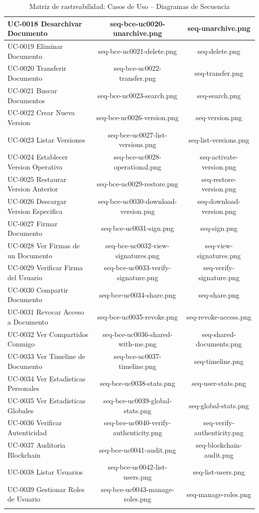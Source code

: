 \documentclass[11pt, a4paper]{article}
\begin{document}
{\begin{center}
\begin{longtable}{|p{2.8cm}|c|c|}
\hline
UC-0018 Desarchivar Documento & seq-bce-uc0020-unarchive.png & seq-unarchive.png \\
\hline
UC-0019 Eliminar Documento & seq-bce-uc0021-delete.png & seq-delete.png \\
\hline
UC-0020 Transferir Documento & seq-bce-uc0022-transfer.png & seq-transfer.png \\
\hline
UC-0021 Buscar Documentos & seq-bce-uc0023-search.png & seq-search.png \\
\hline
UC-0022 Crear Nueva Version & seq-bce-uc0026-version.png & seq-version.png \\
\hline
UC-0023 Listar Versiones & seq-bce-uc0027-list-versions.png & seq-list-versions.png \\
\hline
UC-0024 Establecer Version Operativa & seq-bce-uc0028-operational.png & seq-activate-version.png \\
\hline
UC-0025 Restaurar Version Anterior & seq-bce-uc0029-restore.png & seq-restore-version.png \\
\hline
UC-0026 Descargar Version Especifica & seq-bce-uc0030-download-version.png & seq-download-version.png \\
\hline
UC-0027 Firmar Documento & seq-bce-uc0031-sign.png & seq-sign.png \\
\hline
UC-0028 Ver Firmas de un Documento & seq-bce-uc0032-view-signatures.png & seq-view-signatures.png \\
\hline
UC-0029 Verificar Firma del Usuario & seq-bce-uc0033-verify-signature.png & seq-verify-signature.png \\
\hline
UC-0030 Compartir Documento & seq-bce-uc0034-share.png & seq-share.png \\
\hline
UC-0031 Revocar Acceso a Documento & seq-bce-uc0035-revoke.png & seq-revoke-access.png \\
\hline
UC-0032 Ver Compartidos Conmigo & seq-bce-uc0036-shared-with-me.png & seq-shared-documents.png \\
\hline
UC-0033 Ver Timeline de Documento & seq-bce-uc0037-timeline.png & seq-timeline.png \\
\hline
UC-0034 Ver Estadisticas Personales & seq-bce-uc0038-stats.png & seq-user-stats.png \\
\hline
UC-0035 Ver Estadisticas Globales & seq-bce-uc0039-global-stats.png & seq-global-stats.png \\
\hline
UC-0036 Verificar Autenticidad & seq-bce-uc0040-verify-authenticity.png & seq-verify-authenticity.png \\
\hline
UC-0037 Auditoria Blockchain & seq-bce-uc0041-audit.png & seq-blockchain-audit.png \\
\hline
UC-0038 Listar Usuarios & seq-bce-uc0042-list-users.png & seq-list-users.png \\
\hline
UC-0039 Gestionar Roles de Usuario & seq-bce-uc0043-manage-roles.png & seq-manage-roles.png \\
\hline
\caption{Matriz de rastreabilidad: Casos de Uso -- Diagramas de Secuencia}
\label{tab:matriz-uc-seq}
\end{longtable}
\end{center}

}
\end{document}
